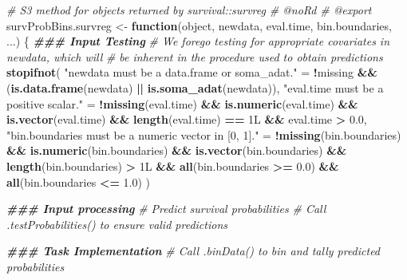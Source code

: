 \documentclass[
]{book}
\newenvironment{Shaded}{\begin{snugshade}}{\end{snugshade}}
\newcommand{\CommentTok}[1]{\textcolor[rgb]{0.56,0.35,0.01}{\textit{#1}}}
\newcommand{\ControlFlowTok}[1]{\textcolor[rgb]{0.13,0.29,0.53}{\textbf{#1}}}
\newcommand{\DocumentationTok}[1]{\textcolor[rgb]{0.56,0.35,0.01}{\textbf{\textit{#1}}}}
\newcommand{\FloatTok}[1]{\textcolor[rgb]{0.00,0.00,0.81}{#1}}
\newcommand{\FunctionTok}[1]{\textcolor[rgb]{0.13,0.29,0.53}{\textbf{#1}}}
\newcommand{\NormalTok}[1]{#1}
\newcommand{\OtherTok}[1]{\textcolor[rgb]{0.56,0.35,0.01}{#1}}
\newcommand{\SpecialCharTok}[1]{\textcolor[rgb]{0.81,0.36,0.00}{\textbf{#1}}}
\newcommand{\StringTok}[1]{\textcolor[rgb]{0.31,0.60,0.02}{#1}}
\begin{document}
\begin{Shaded}
\begin{Highlighting}[]
\CommentTok{\#\textquotesingle{} S3 method for objects returned by \textasciigrave{}survival::survreg\textasciigrave{}}
\CommentTok{\#\textquotesingle{} @noRd}
\CommentTok{\#\textquotesingle{} @export}
\NormalTok{survProbBins.survreg }\OtherTok{\textless{}{-}} \ControlFlowTok{function}\NormalTok{(object, newdata, eval.time, bin.boundaries, ...) \{}
  \DocumentationTok{\#\#\# Input Testing}
  \CommentTok{\# We forego testing for appropriate covariates in \textasciigrave{}newdata\textasciigrave{}, which will}
  \CommentTok{\#   be inherent in the procedure used to obtain predictions}
  \FunctionTok{stopifnot}\NormalTok{(}
    \StringTok{"\textasciigrave{}newdata\textasciigrave{} must be a data.frame or soma\_adat."} \OtherTok{=} 
      \SpecialCharTok{!}\NormalTok{missing }\SpecialCharTok{\&\&}\NormalTok{ (}\FunctionTok{is.data.frame}\NormalTok{(newdata) }\SpecialCharTok{||} \FunctionTok{is.soma\_adat}\NormalTok{(newdata)),}
    \StringTok{"\textasciigrave{}eval.time\textasciigrave{} must be a positive scalar."} \OtherTok{=} 
      \SpecialCharTok{!}\FunctionTok{missing}\NormalTok{(eval.time) }\SpecialCharTok{\&\&} \FunctionTok{is.numeric}\NormalTok{(eval.time) }\SpecialCharTok{\&\&} 
        \FunctionTok{is.vector}\NormalTok{(eval.time) }\SpecialCharTok{\&\&} \FunctionTok{length}\NormalTok{(eval.time) }\SpecialCharTok{==}\NormalTok{ 1L }\SpecialCharTok{\&\&}\NormalTok{ eval.time }\SpecialCharTok{\textgreater{}} \FloatTok{0.0}\NormalTok{,}
    \StringTok{"\textasciigrave{}bin.boundaries\textasciigrave{} must be a numeric vector in [0, 1]."} \OtherTok{=} 
      \SpecialCharTok{!}\FunctionTok{missing}\NormalTok{(bin.boundaries) }\SpecialCharTok{\&\&} \FunctionTok{is.numeric}\NormalTok{(bin.boundaries) }\SpecialCharTok{\&\&} 
        \FunctionTok{is.vector}\NormalTok{(bin.boundaries) }\SpecialCharTok{\&\&} \FunctionTok{length}\NormalTok{(bin.boundaries) }\SpecialCharTok{\textgreater{}}\NormalTok{ 1L }\SpecialCharTok{\&\&} 
        \FunctionTok{all}\NormalTok{(bin.boundaries }\SpecialCharTok{\textgreater{}=} \FloatTok{0.0}\NormalTok{) }\SpecialCharTok{\&\&} \FunctionTok{all}\NormalTok{(bin.boundaries }\SpecialCharTok{\textless{}=} \FloatTok{1.0}\NormalTok{)}
\NormalTok{  )}
  
  \DocumentationTok{\#\#\# Input processing}
  \CommentTok{\# Predict survival probabilities}
  \CommentTok{\# Call .testProbabilities() to ensure valid predictions}
  
  \DocumentationTok{\#\#\# Task Implementation}
  \CommentTok{\# Call \textasciigrave{}.binData()\textasciigrave{} to bin and tally predicted probabilities}


\end{Highlighting}
\end{Shaded}
\end{document}
